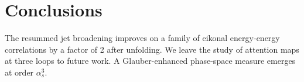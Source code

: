 \section{Conclusions}\label{sec:conclusions}

The resummed jet broadening improves on a family of eikonal
energy-energy correlations by a factor of 2 after unfolding. We leave
the study of attention maps at three loops to future work. A
Glauber-enhanced phase-space measure emerges at order $\alpha_s^3$.


